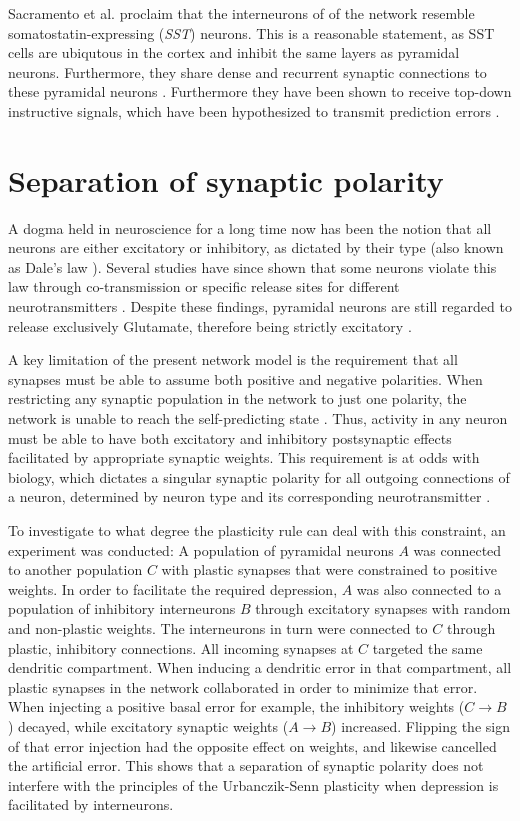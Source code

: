Sacramento et al. proclaim that the interneurons of of the network resemble somatostatin-expressing (\textit{SST})
neurons. This is a reasonable statement, as SST cells are ubiqutous in the cortex and inhibit the same layers as
pyramidal neurons. Furthermore, they share dense and recurrent synaptic connections to these pyramidal neurons
\citep{urban2016somatostatin}. Furthermore they have been shown to receive top-down instructive signals, which have 
been hypothesized to transmit prediction errors \citep{Leinweber2017}. 


\section{Separation of synaptic polarity}


A dogma held in neuroscience for a long time now has been the notion that all neurons are either excitatory or
inhibitory, as dictated by their type (also known as Dale's law \citep{Kandel1968}). Several studies have since shown
that some neurons violate this law through co-transmission or specific release sites for different neurotransmitters
\citep{Svensson2019,Barranca2022}. Despite these findings, pyramidal neurons are still regarded to release exclusively
Glutamate, therefore being strictly excitatory \citep{gerfen2018long,spruston2008pyramidal,Eyal2018}.



A key limitation of the present network model is the
requirement that all synapses must be able to assume both positive and negative polarities. When restricting any
synaptic population in the network to just one polarity, the network is unable to reach the self-predicting state
. Thus, activity in any neuron must be able to have both excitatory and inhibitory postsynaptic effects
facilitated by appropriate synaptic weights. This requirement is at odds with biology, which dictates a singular
synaptic polarity for all outgoing connections of a neuron, determined by neuron type and its corresponding
neurotransmitter \citeme.


To investigate to what degree the plasticity rule can deal with this constraint, an experiment was conducted: A
population of pyramidal neurons $A$  was connected to another population $C$ with plastic synapses that were constrained
to positive weights. In order to facilitate the required depression, $A$ was also connected to a population of
inhibitory interneurons $B$ through excitatory synapses with random and non-plastic weights. The interneurons in turn
were connected to $C$ through plastic, inhibitory connections. All incoming synapses at $C$ targeted the same dendritic
compartment. When inducing a dendritic error in that compartment, all plastic synapses in the network collaborated in
order to minimize that error. When injecting a positive basal error for example, the inhibitory weights ($C \rightarrow
    B$) decayed, while excitatory synaptic weights ($A \rightarrow B$) increased. Flipping the sign of that error injection
had the opposite effect on weights, and likewise cancelled the artificial error. This shows that a separation of
synaptic polarity does not interfere with the principles of the Urbanczik-Senn plasticity when depression is facilitated
by interneurons.

